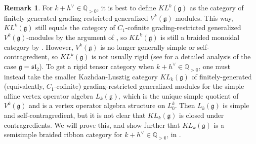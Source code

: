 \documentclass[11pt, reqno]{amsart}
\theoremstyle{definition}\newtheorem{defi}[thm]{Definition}
\theoremstyle{definition}\newtheorem{rem}[thm]{Remark}
\theoremstyle{definition}\newtheorem{exam}[thm]{Example}
\theoremstyle{definition}\newtheorem{assum}[thm]{Assumption}
\newcommand{\QQ}{\mathbb{Q}}
\begin{document}
\begin{rem}
For $k+h^\vee\in\QQ_{>0}$, it is best to define $KL^k(\mathfrak{g})$ as the category of finitely-generated grading-restricted generalized $V^k(\mathfrak{g})$-modules. This way, $KL^k(\mathfrak{g})$ still equals the category of $C_1$-cofinite grading-restricted generalized $V^k(\mathfrak{g})$-modules by the argument of \cite[Proposition 2.5]{MY}, so $KL^k(\mathfrak{g})$ is still a braided monoidal category by \cite{Hu}. However, $V^k(\mathfrak{g})$ is no longer generally simple or self-contragredient, so $KL^k(\mathfrak{g})$ is not usually rigid (see \cite{MY} for a detailed analysis of the case $\mathfrak{g}=\mathfrak{sl}_2$). To get a rigid tensor category when $k+h^\vee\in\QQ_{>0}$, one must instead take the smaller Kazhdan-Lusztig category $KL_k(\mathfrak{g})$ of finitely-generated (equivalently, $C_1$-cofinite) grading-restricted generalized modules for the simple affine vertex operator algebra $L_k(\mathfrak{g})$, which is the unique simple quotient of $V^k(\mathfrak{g})$ and is a vertex operator algebra structure on $L^k_0$. Then $L_k(\mathfrak{g})$ is simple and self-contragredient, but it is not clear that $KL_k(\mathfrak{g})$ is closed under contragredients. We will prove this, and show further that $KL_k(\mathfrak{g})$ is a semisimple braided ribbon category for $k+h^\vee\in\QQ_{>0}$, in \cite{McR3}.
\end{rem}
\end{document}
